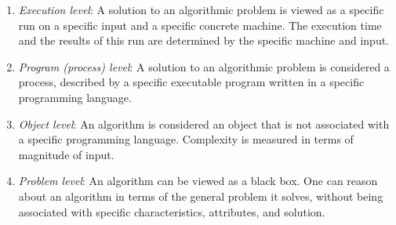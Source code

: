 \begin{enumerate}
\item \emph{Execution level}: A solution to an algorithmic problem is viewed as a specific run on
a specific input and a specific concrete machine. The execution time and the results of this run are determined by the specific machine and input.

\item \emph{Program (process) level}: A solution to an algorithmic problem is considered a process, described by a specific executable program written in a specific programming language.

\item \emph{Object level}: An algorithm is considered an object
that is not associated with a specific programming language. Complexity is measured in terms of magnitude
of input.

\item \emph{Problem level}: An algorithm can be viewed as a black box. One can reason about an algorithm in terms of the general problem it solves, without being associated with specific characteristics, attributes, and solution.
\end{enumerate}


